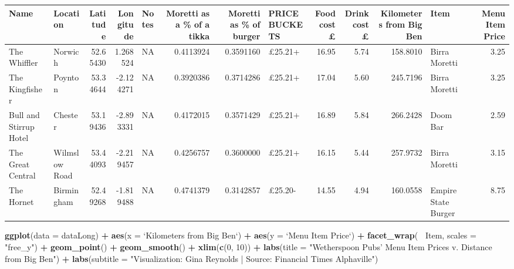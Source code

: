 \documentclass[]{book}
\newenvironment{Shaded}{\begin{snugshade}}{\end{snugshade}}
\newcommand{\KeywordTok}[1]{\textcolor[rgb]{0.13,0.29,0.53}{\textbf{#1}}}
\newcommand{\DataTypeTok}[1]{\textcolor[rgb]{0.13,0.29,0.53}{#1}}
\newcommand{\DecValTok}[1]{\textcolor[rgb]{0.00,0.00,0.81}{#1}}
\newcommand{\StringTok}[1]{\textcolor[rgb]{0.31,0.60,0.02}{#1}}
\newcommand{\OperatorTok}[1]{\textcolor[rgb]{0.81,0.36,0.00}{\textbf{#1}}}
\newcommand{\NormalTok}[1]{#1}
\theoremstyle{definition}
\theoremstyle{definition}
\theoremstyle{definition}
\theoremstyle{remark}
\begin{document}
\begin{tabular}{l|l|r|r|l|r|r|l|r|r|r|l|r}
\hline
Name & Location & Latitude & Longitude & Notes & Moretti as a \% of a tikka & Moretti as \% of burger & PRICE BUCKETS & Food cost £ & Drink cost £ & Kilometers from Big Ben & Item & Menu Item Price\\
\hline
The Whiffler & Norwich & 52.65430 & 1.268524 & NA & 0.4113924 & 0.3591160 & £25.21+ & 16.95 & 5.74 & 158.8010 & Birra Moretti & 3.25\\
\hline
The Kingfisher & Poynton & 53.34644 & -2.124271 & NA & 0.3920386 & 0.3714286 & £25.21+ & 17.04 & 5.60 & 245.7196 & Birra Moretti & 3.25\\
\hline
Bull and Stirrup Hotel & Chester & 53.19436 & -2.893331 & NA & 0.4172015 & 0.3571429 & £25.21+ & 16.89 & 5.84 & 266.2428 & Doom Bar & 2.59\\
\hline
The Great Central & Wilmslow Road & 53.44093 & -2.219457 & NA & 0.4256757 & 0.3600000 & £25.21+ & 16.15 & 5.44 & 257.9732 & Birra Moretti & 3.15\\
\hline
The Hornet & Birmingham & 52.49268 & -1.819488 & NA & 0.4741379 & 0.3142857 & £25.20- & 14.55 & 4.94 & 160.0558 & Empire State Burger & 8.75\\
\hline
\end{tabular}

\begin{Shaded}
\begin{Highlighting}[]
\KeywordTok{ggplot}\NormalTok{(}\DataTypeTok{data =}\NormalTok{ dataLong) }\OperatorTok{+}
\StringTok{  }\KeywordTok{aes}\NormalTok{(}\DataTypeTok{x =} \StringTok{`}\DataTypeTok{Kilometers from Big Ben}\StringTok{`}\NormalTok{) }\OperatorTok{+}
\StringTok{  }\KeywordTok{aes}\NormalTok{(}\DataTypeTok{y =} \StringTok{`}\DataTypeTok{Menu Item Price}\StringTok{`}\NormalTok{) }\OperatorTok{+}
\StringTok{  }\KeywordTok{facet_wrap}\NormalTok{(}\OperatorTok{~}\StringTok{ }\NormalTok{Item, }\DataTypeTok{scales =} \StringTok{"free_y"}\NormalTok{) }\OperatorTok{+}
\StringTok{  }\KeywordTok{geom_point}\NormalTok{() }\OperatorTok{+}
\StringTok{  }\KeywordTok{geom_smooth}\NormalTok{() }\OperatorTok{+}
\StringTok{  }\KeywordTok{xlim}\NormalTok{(}\KeywordTok{c}\NormalTok{(}\DecValTok{0}\NormalTok{, }\DecValTok{10}\NormalTok{)) }\OperatorTok{+}
\StringTok{  }\KeywordTok{labs}\NormalTok{(}\DataTypeTok{title =} \StringTok{"Wetherspoon Pubs' Menu Item Prices v. Distance from Big Ben"}\NormalTok{) }\OperatorTok{+}
\StringTok{  }\KeywordTok{labs}\NormalTok{(}\DataTypeTok{subtitle =} \StringTok{"Visualization: Gina Reynolds | Source: Financial Times Alphaville"}\NormalTok{) }
\end{Highlighting}
\end{Shaded}
\end{document}
